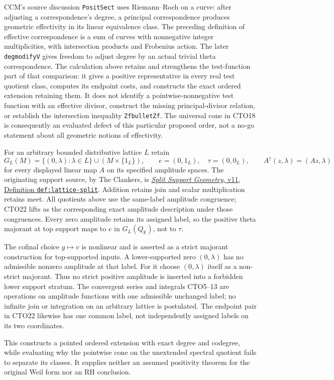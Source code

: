 CCM's source discussion \texttt{PositSect} uses Riemann--Roch
on a curve: after adjusting a correspondence's degree, a principal
correspondence produces geometric effectivity in its linear
equivalence class. The preceding definition of effective
correspondence is a sum of curves with nonnegative integer
multiplicities, with intersection products and Frobenius action.
The later \texttt{degmodifyV} gives freedom to adjust degree by
an actual trivial theta correspondence. The calculation above
retains and strengthens the test-function part of that comparison:
it gives a positive representative in every real test quotient
class, computes its endpoint costs, and constructs the exact
ordered extension retaining them. It does not identify a
pointwise-nonnegative test function with an effective divisor,
construct the missing principal-divisor relation, or establish
the intersection inequality \texttt{ZfbulletZf}. The universal
cone in CTO18 is consequently an evaluated defect of this
particular proposed order, not a no-go statement about all
geometric notions of effectivity.

For an arbitrary bounded distributive lattice $L$ retain
\begin{equation}\tag{CTO24}
G_L(M)=\{(0,\lambda):\lambda\in L\}\cup(M\times\{1_L\}),
\qquad e=(0,1_L),\quad\tau=(0,0_L),\qquad
A^\uparrow(z,\lambda)=(Az,\lambda)
\end{equation}
for every displayed linear map $A$ on its specified amplitude
spaces. The originating support source, by The Clankers, is
\href{https://github.com/KokunoYumeto/zeta-function-research-reader/blob/a2851f9eb352e7e4376bc629de86fa4ed9c1c434/workbenches/splitzero-tandem/foundations/split-support-geometry-v11/split_support_geometry_arithmetic_curve_v11.tex}{\emph{Split Support Geometry}, v11,
Definition \texttt{def:lattice-split}}.
Addition retains join and scalar multiplication retains meet.
All quotients above use the same-label amplitude congruence;
CTO22 lifts as the corresponding exact amplitude description
under those congruences. Every zero amplitude retains its
assigned label, so the positive theta majorant at top support
maps to $e$ in $G_L(Q_{\mathbb R})$, not to $\tau$.

The cofinal choice $g\mapsto v$ is nonlinear and is asserted
as a strict majorant construction for top-supported inputs.
A lower-supported zero $(0,\lambda)$ has no admissible nonzero
amplitude at that label. For it choose $(0,\lambda)$ itself as
a non-strict majorant. Thus no strict positive amplitude is
inserted into a forbidden lower support stratum. The convergent
series and integrals CTO5--13 are operations on amplitude
functions with one admissible unchanged label; no infinite
join or integration on an arbitrary lattice is postulated.
The endpoint pair in CTO22 likewise has one common label,
not independently assigned labels on its two coordinates.

This constructs a pointed ordered extension with exact degree
and codegree, while evaluating why the pointwise cone on the
unextended spectral quotient fails to separate its classes.
It supplies neither an assumed positivity theorem for the
original Weil form nor an RH conclusion.
